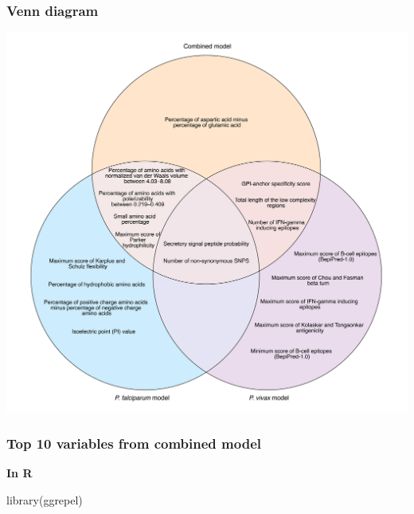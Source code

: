 \documentclass[
  11pt,
  oneside]{book}
\newenvironment{Shaded}{\begin{snugshade}}{\end{snugshade}}
\newcommand{\FunctionTok}[1]{\textcolor[rgb]{0.00,0.00,0.00}{#1}}
\newcommand{\NormalTok}[1]{#1}
\begin{document}
\hypertarget{venn-diagram}{%
\subsubsection{Venn diagram}\label{venn-diagram}}

\begin{center}\includegraphics[width=1\linewidth]{./figures/Supplementary Fig 10} \end{center}

\hypertarget{top-10-variables-from-combined-model}{%
\subsubsection{Top 10 variables from combined model}\label{top-10-variables-from-combined-model}}

\textbf{In R}

\begin{Shaded}
\begin{Highlighting}[]
\FunctionTok{library}\NormalTok{(ggrepel)}
\end{Highlighting}
\end{Shaded}
\end{document}
